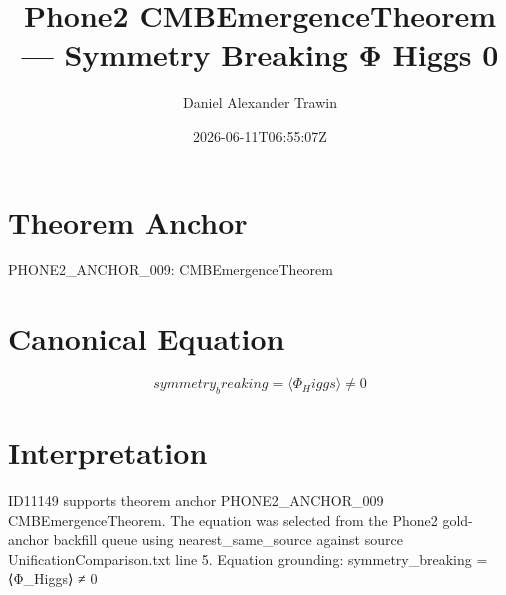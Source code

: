 \documentclass[11pt]{article}
\title{Phone2 CMBEmergenceTheorem — Symmetry Breaking Φ Higgs 0}
\author{Daniel Alexander Trawin}
\date{2026-06-11T06:55:07Z}
\begin{document}
\maketitle
\section*{Theorem Anchor}
PHONE2_ANCHOR_009: CMBEmergenceTheorem
\section*{Canonical Equation}
\[
symmetry_breaking = ⟨Φ_Higgs⟩ ≠ 0
\]
\section*{Interpretation}
ID11149 supports theorem anchor PHONE2_ANCHOR_009 CMBEmergenceTheorem. The equation was selected from the Phone2 gold-anchor backfill queue using nearest_same_source against source UnificationComparison.txt line 5. Equation grounding: symmetry_breaking = ⟨Φ_Higgs⟩ ≠ 0
\end{document}
